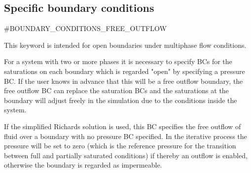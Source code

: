 \subsection*{Specific boundary conditions}

\#BOUNDARY\_CONDITIONS\_FREE\_OUTFLOW

This keyword is intended for open boundaries under multiphase flow conditions.

For a system with two or more phases it is necessary to specify BCs for the saturations on each boundary
which is regarded "open" by specifying a pressure BC. If the user knows in advance that this will be a free
outflow boundary, the free outflow BC can replace the saturation BCs and the saturations at the boundary will
adjust freely in the simulation due to the conditions inside the system.

If the simplified Richards solution is used, this BC specifies the free outflow of fluid over a boundary with
no pressure BC specified. In the iterative process the pressure will be set to zero (which is the reference
pressure for the transition between full and partially saturated conditions) if thereby an outflow is
enabled, otherwise the boundary is regarded as impermeable.


